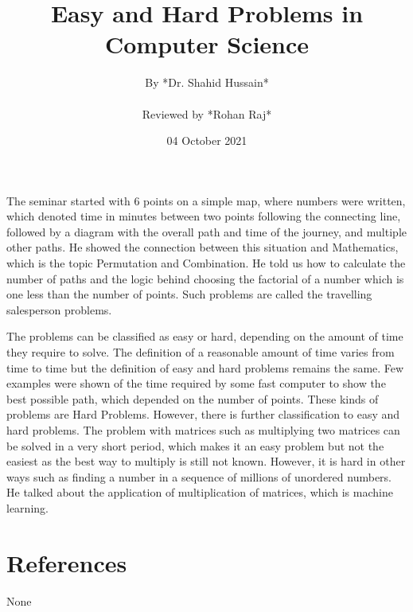 \documentclass{article}
\title{Easy and Hard Problems in Computer Science} %
\author{By *Dr. Shahid Hussain* \\ \\ Reviewed by *Rohan Raj*} %
\date{04 October 2021} %
\begin{document}
\maketitle
The seminar started with 6 points on a simple map, where numbers were written, which denoted time in minutes between two points following the connecting line, followed by a diagram with the overall path and time of the journey, and multiple other paths. He showed the connection between this situation and Mathematics, which is the topic Permutation and Combination. He told us how to calculate the number of paths and the logic behind choosing the factorial of a number which is one less than the number of points. Such problems are called the travelling salesperson problems. 
\par
The problems can be classified as easy or hard, depending on the amount of time they require to solve. The definition of a reasonable amount of time varies from time to time but the definition of easy and hard problems remains the same. Few examples were shown of the time required by some fast computer to show the best possible path, which depended on the number of points. These kinds of problems are Hard Problems. However, there is further classification to easy and hard problems. The problem with matrices such as multiplying two matrices can be solved in a very short period, which makes it an easy problem but not the easiest as the best way to multiply is still not known. However, it is hard in other ways such as finding a number in a sequence of millions of unordered numbers. He talked about the application of multiplication of matrices, which is machine learning. 

\section*{References}
None 
\end{document}

